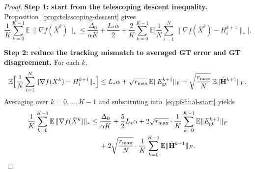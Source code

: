 \documentclass{article}
\begin{document}
\begin{proof}
\medskip\noindent\textbf{Step 1: start from the telescoping descent inequality.}
Proposition~\ref{prop:telescoping-descent} gives
\begin{equation}
\label{eq:pf-final-start}
\frac{1}{K}\sum_{k=0}^{K-1}\mathbb{E}\,\|\nabla f(\bar X^k)\|_*
\le
\frac{\Delta_0}{\alpha K}
+\frac{L_*\alpha}{2}
+\frac{2}{K}\sum_{k=0}^{K-1}\mathbb{E}\Big[\frac{1}{N}\sum_{i=1}^N\|\nabla f(\bar X^k)-H_i^{k+1}\|_*\Big].
\end{equation}

\medskip\noindent\textbf{Step 2: reduce the tracking mismatch to averaged GT error and GT disagreement.}
For each $k$,
\[
\mathbb{E}\Big[\frac{1}{N}\sum_{i=1}^N\|\nabla f(\bar X^k)-H_i^{k+1}\|_*\Big]
\le L_*\alpha
+\sqrt{r_{\max}}\,\mathbb{E}\|E_{\rm gt}^{k+1}\|_F
+\sqrt{\frac{r_{\max}}{N}}\,\mathbb{E}\|\tilde{\mathbf H}^{k+1}\|_F.
\]
Averaging over $k=0,\dots,K-1$ and substituting into~\eqref{eq:pf-final-start} yields
\begin{equation}
\label{eq:pf-final-master}
\begin{split}
\frac{1}{K}\sum_{k=0}^{K-1}\mathbb{E}\,\|\nabla f(\bar X^k)\|_*
\le&\;
\frac{\Delta_0}{\alpha K}
+\frac{5}{2}L_*\alpha
+2\sqrt{r_{\max}}\cdot \frac{1}{K}\sum_{k=0}^{K-1}\mathbb{E}\|E_{\rm gt}^{k+1}\|_F
\\&\;+2\sqrt{\frac{r_{\max}}{N}}\cdot \frac{1}{K}\sum_{k=0}^{K-1}\mathbb{E}\|\tilde{\mathbf H}^{k+1}\|_F.
\end{split}
\end{equation}


\end{proof}
\end{document}
